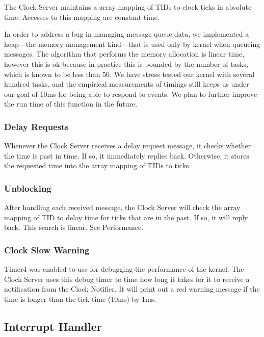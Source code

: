\documentclass[letterpaper]{article}
\begin{document}
The Clock Server maintains a array mapping of TIDs to clock ticks in absolute time. Accesses to this mapping are constant time.

In order to address a bug in managing message queue data, we implemented a heap—the memory management kind—that is used only by kernel when queueing messages.  The algorithm that performs the memory allocation is linear time, however this is ok because in practice this is bounded by the number of tasks, which is known to be less than 50.  We have stress tested our kernel with several hundred tasks, and the empirical measurements of timings still keeps us under our goal of 10ms for being able to respond to events.  We plan to further improve the run time of this function in the future.


\subsubsection{Delay Requests%
  \label{delay-requests}%
}

Whenever the Clock Server receives a delay request message, it checks whether the time is past in time. If so, it immediately replies back. Otherwise, it stores the requested time into the array mapping of TIDs to ticks.


\subsubsection{Unblocking%
  \label{unblocking}%
}

After handling each received message, the Clock Server will check the array mapping of TID to delay time for ticks that are in the past. If so, it will reply back. This search is linear. See Performance.


\subsubsection{Clock Slow Warning%
  \label{clock-slow-warning}%
}

Timer4 was enabled to use for debugging the performance of the kernel. The Clock Server uses this debug timer to time how long it takes for it to receive a notification from the Clock Notifier. It will print out a red warning message if the time is longer than the tick time (10ms) by 1ms.


\subsection{Interrupt Handler%
  \label{interrupt-handler}%
}
\end{document}
